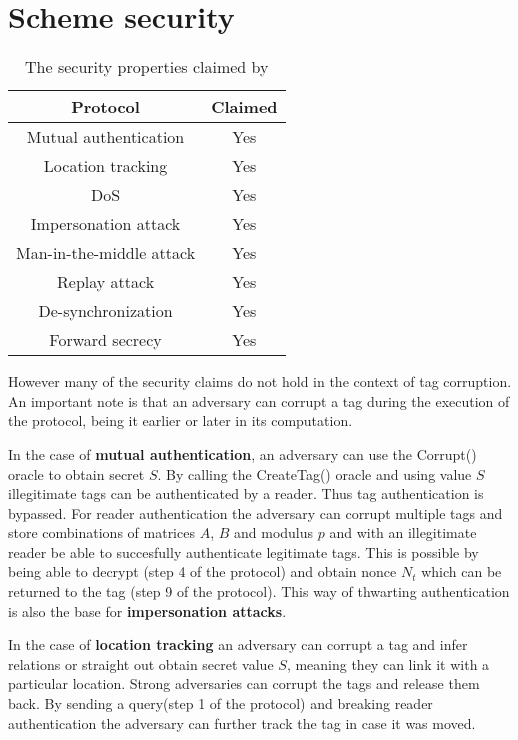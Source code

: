 \section{Scheme security}
\begin{table}[H]
    \centering
    \caption{The security properties claimed by \cite{BOM}}
    \begin{tabular}{| c | c |}
        \hline
        Protocol & Claimed \\
        \hline
        Mutual authentication & Yes \\
        Location tracking & Yes \\
        DoS & Yes \\
        Impersonation attack & Yes  \\
        Man-in-the-middle attack & Yes  \\
        Replay attack & Yes  \\
        De-synchronization & Yes  \\
        Forward secrecy & Yes \\
        \hline
    \end{tabular}
\end{table}

    However many of the security claims do not hold in the context of tag corruption. An important note is that an adversary can corrupt
    a tag during the execution of the protocol, being it earlier or later in its computation.

    In the case of \textbf{mutual authentication}, an adversary can use the Corrupt() oracle to obtain secret $S$. By calling the CreateTag()
    oracle and using value $S$ illegitimate tags can be authenticated by a reader. Thus tag authentication is bypassed.
    For reader authentication the adversary can corrupt
    multiple tags and store combinations of matrices $A$, $B$ and modulus $p$ and with an illegitimate reader be able to succesfully
    authenticate legitimate tags. This is possible by being able to decrypt (step 4 of the protocol) and obtain nonce $N_t$ which can
    be returned to the tag (step 9 of the protocol). This way of thwarting authentication is also the base for \textbf{impersonation attacks}.
    
    In the case of \textbf{location tracking} an adversary can corrupt a tag and infer relations or straight out obtain secret value $S$, meaning
    they can link it with a particular location. Strong adversaries can corrupt the tags and release them back. By sending a query(step 1
    of the protocol) and breaking reader authentication the adversary can further track the tag in case it was moved.

